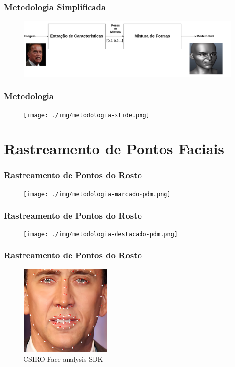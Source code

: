 \documentclass[brazil]{beamer}
\begin{document}
\begin{frame}
 	\frametitle{Metodologia Simplificada}
       \begin{figure}
         \centering
         \includegraphics[width = 1.1\textwidth]{./img/EZ3d-simplified.png}
       \end{figure}   
\end{frame}


\begin{frame}
	\frametitle{Metodologia}
      \begin{figure}
        \centering
        \texttt{[image: ./img/metodologia-slide.png]}
      \end{figure}   
\end{frame}

\section{Rastreamento de Pontos Faciais}

\begin{frame}
\frametitle{Rastreamento de Pontos do Rosto}
        \begin{figure}
            \centering
            \texttt{[image: ./img/metodologia-marcado-pdm.png]}
      \end{figure}
\end{frame}

\begin{frame}
\frametitle{Rastreamento de Pontos do Rosto}
        \begin{figure}
            \centering
            \texttt{[image: ./img/metodologia-destacado-pdm.png]}
      \end{figure}
\end{frame}

\begin{frame}
\frametitle{Rastreamento de Pontos do Rosto}
        \begin{figure}
            \centering
            \includegraphics[width = 0.4\textwidth, keepaspectratio]{./img/nick-marked.png}
           \caption{CSIRO Face analysis SDK}
      \end{figure}
\end{frame}
\end{document}
